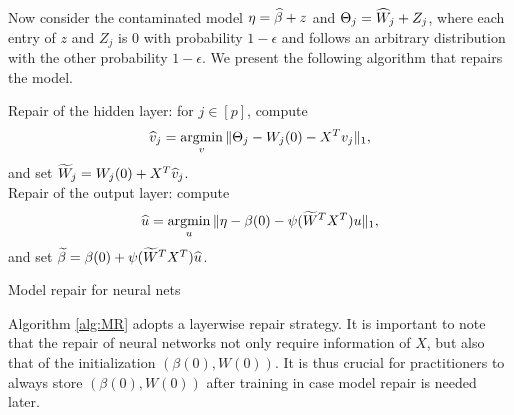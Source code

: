 Now consider the contaminated model $\eta=\widehat{\beta}+z$ and $\Theta_j=\widehat{W}_j+Z_j$, where each entry of $z$ and $Z_j$ is $0$ with probability $1-\epsilon$ and follows an arbitrary distribution with the other probability $1-\epsilon$. We present the following algorithm that repairs the model.

\begin{algorithm}[H]
\DontPrintSemicolon
{}
\nl Repair of the hidden layer: for $j\in[p]$, compute
$$\widehat{v}_j=\mathop{\rm argmin}_v\|\Theta_j-W_j(0)-X^Tv_j\|_1,$$
and set $\widetilde{W}_j=W_j(0)+X^T\widehat{v}_j$. \\
\nl Repair of the output layer: compute
$$\widehat{u}=\mathop{\rm argmin}_u\|\eta-\beta(0)-\psi(\widetilde{W}^TX^T)u\|_1,$$
and set $\widetilde{\beta}=\beta(0)+\psi(\widetilde{W}^TX^T)\widehat{u}$.
 \caption{Model repair for neural nets}\label{alg:MR}
\end{algorithm}
Algorithm \ref{alg:MR} adopts a layerwise repair strategy. It is important to note that the repair of neural networks not only require information of $X$, but also that of the initialization $(\beta(0),W(0))$. It is thus crucial for practitioners to always store $(\beta(0),W(0))$ after training in case model repair is needed later.

